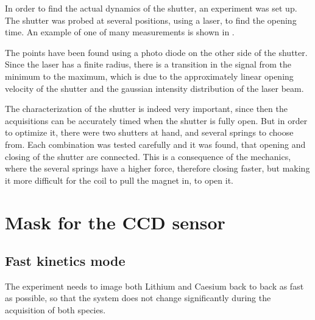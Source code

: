 In order to find the actual dynamics of the shutter, an experiment was set up. The shutter was probed at several positions, using a laser, to find the opening time. An example of one of many measurements is shown in .

The points have been found using a photo diode on the other side of the shutter. Since the laser has a finite radius, there is a transition in the signal from the minimum to the maximum, which is due to the approximately linear opening velocity of the shutter and the gaussian intensity distribution of the laser beam.




The characterization of the shutter is indeed very important, since then the acquisitions can be accurately timed when the shutter is fully open. But in order to optimize it, there were two shutters at hand, and several springs to choose from. Each combination was tested carefully and it was found, that opening and closing of the shutter are connected. This is a consequence of the mechanics, where the several springs have a higher force, therefore closing faster, but making it more difficult for the coil to pull the magnet in, to open it. 
\newpage
\section{Mask for the CCD sensor}
\subsection{Fast kinetics mode}
\label{ch:fast_kin}
The experiment needs to image both Lithium and Caesium back to back as fast as possible, so that the system does not change significantly during the acquisition of both species.

